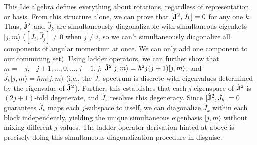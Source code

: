 This Lie algebra defines everything about rotations, regardless of representation or basis. From this structure alone, we can prove that $[\hat{\mathbf{J}}^2, \hat{J}_k]=0$ for any one $k$. Thus, $\hat{\mathbf{J}}^2$ and $\hat{J}_k$ are simultaneously diagonalizable with simultaneous eigenkets $|j, m\rangle$ ($[\hat{J}_i,\hat{J}_j]\ne 0$ when $j\ne i$, so we can't simultaneously diagonalize all components of angular momentum at once. We can only add one component to our commuting set). Using ladder operators, we can further show that $m=-j, -j+1, \dots,0, \dots,j-1,j$; $\hat{\mathbf{J}}^2|j, m\rangle=\hbar^2j(j+1)|j,m\rangle$; and $\hat{J}_k|j,m\rangle = \hbar m|j,m\rangle$ (i.e., the $\hat{J}_z$ spectrum is discrete with eigenvalues determined by the eigenvalue of $\hat{\mathbf{J}}^2$). Further, this establishes that each $j$-eigenspace of $\hat{\mathbf{J}}^2$ is $(2j+1)$-fold degenerate, and $\hat{J}_z$ resolves this degeneracy. Since $[\hat{\mathbf{J}}^2, \hat{J}_k]=0$ guarantees $\hat{J}_k$ maps each $j$-subspace to itself, we can diagonalize $\hat{J}_k$ within each block independently, yielding the unique simultaneous eigenbasis $|j, m\rangle$ without mixing different $j$ values. The ladder operator derivation hinted at above is precisely doing this simultaneous diagonalization procedure in disguise.\\

